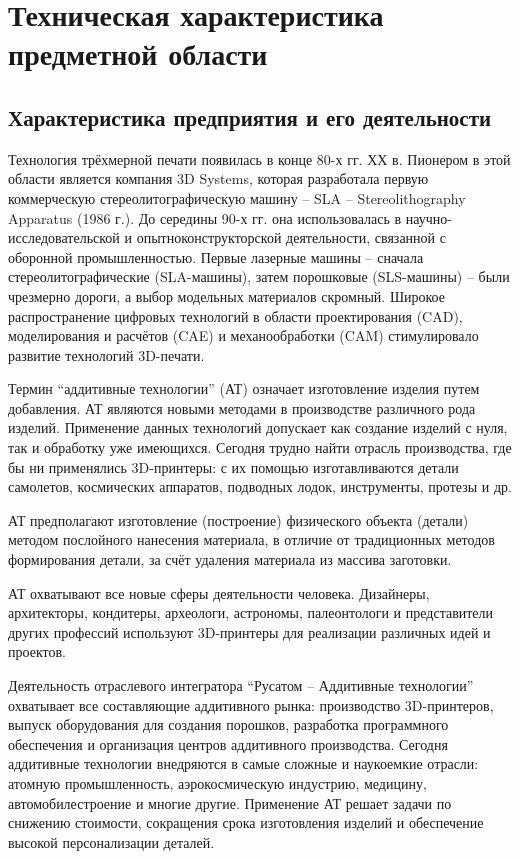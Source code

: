 \newpage
\section{Техническая характеристика предметной области}
\subsection{Характеристика предприятия и его деятельности}

Технология трёхмерной печати появилась в конце 80-х гг. ХХ в. Пионером в этой области является компания 3D Systems, которая разработала первую коммерческую стереолитографическую машину – SLA – Stereolithography Apparatus (1986 г.). До середины 90-х гг. она использовалась в научно-исследовательской и опытноконструкторской деятельности, связанной с оборонной промышленностью. Первые лазерные машины – сначала стереолитографические (SLA-машины), затем порошковые (SLS-машины) – были чрезмерно дороги, а выбор модельных материалов скромный. Широкое распространение цифровых технологий в области проектирования (CAD), моделирования и расчётов (CAE) и механообработки (CAM) стимулировало развитие технологий 3D-печати. 

Термин ``аддитивные технологии'' (АТ) означает изготовление изделия путем добавления. АТ являются новыми методами в производстве различного рода изделий. Применение данных технологий допускает как создание изделий с нуля, так и обработку уже имеющихся. Сегодня трудно найти отрасль производства, где бы ни применялись 3D-принтеры: с их помощью изготавливаются детали самолетов, космических аппаратов, подводных лодок, инструменты, протезы и др.

АТ предполагают изготовление (построение) физического объекта (детали) методом послойного нанесения материала, в отличие от традиционных методов формирования детали, за счёт удаления материала из массива заготовки.

АТ охватывают все новые сферы деятельности человека. Дизайнеры, архитекторы, кондитеры, археологи, астрономы, палеонтологи и представители других профессий используют 3D-принтеры для реализации различных идей и проектов. 

Деятельность отраслевого интегратора ``Русатом – Аддитивные технологии'' охватывает все составляющие аддитивного рынка: производство 3D-принтеров, выпуск оборудования для создания порошков, разработка программного обеспечения и организация центров аддитивного производства. Сегодня аддитивные технологии внедряются в самые сложные и наукоемкие отрасли: атомную промышленность, аэрокосмическую индустрию, медицину, автомобилестроение и многие другие. Применение АТ решает задачи по снижению стоимости, сокращения срока изготовления изделий и обеспечение высокой персонализации деталей.
